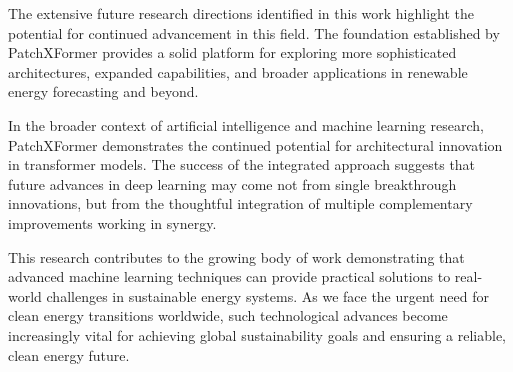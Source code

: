 \documentclass[12pt]{uomthesis}
\begin{document}
The extensive future research directions identified in this work highlight the potential for continued advancement in this field. The foundation established by PatchXFormer provides a solid platform for exploring more sophisticated architectures, expanded capabilities, and broader applications in renewable energy forecasting and beyond.

In the broader context of artificial intelligence and machine learning research, PatchXFormer demonstrates the continued potential for architectural innovation in transformer models. The success of the integrated approach suggests that future advances in deep learning may come not from single breakthrough innovations, but from the thoughtful integration of multiple complementary improvements working in synergy.

This research contributes to the growing body of work demonstrating that advanced machine learning techniques can provide practical solutions to real-world challenges in sustainable energy systems. As we face the urgent need for clean energy transitions worldwide, such technological advances become increasingly vital for achieving global sustainability goals and ensuring a reliable, clean energy future.


\begin{references}
\end{references}
\end{document}
